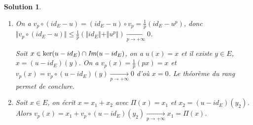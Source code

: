 \documentclass[12pt]{article}
\newtheorem{solution}{Solution}[section]
\theoremstyle{remark}
\numberwithin{equation}{section}
\begin{document}
\begin{solution}
	\phantom{}
	\begin{enumerate}
		\item On a $v_{p}\circ(id_{E}-u)=(id_{E}-u)\circ v_{p}=\frac{1}{p}(id_{E}-u^{p})$, donc $\Vert v_{p}\circ(id_{E}-u)\Vert\leqslant\frac{1}{p}(\Vert id_{E}\Vert+\Vert u^{p}\Vert)\xrightarrow[p\to+\infty]{}0$.
		
		Soit $x\in\ker(u-id_{E})\cap\emph{Im}(u-id_{E})$, on a $u(x)=x$ et il existe $y\in E$, $x=(u-id_{E})(y)$. On a $v_{p}(x)=\frac{1}{p}(px)=x$ et $v_{p}(x)=v_{p}\circ(u-id_{E})(y)\xrightarrow[p\to+\infty]{}0$ d'où $x=0$. Le théorème du rang permet de conclure.

		\item Soit $x\in E$, on écrit $x=x_{1}+x_{2}$ avec $\Pi(x)=x_{1}$ et $x_{2}=(u-id_{E})(y_{2})$. Alors $v_{p}(x)=x_{1}+v_{p}\circ(u-id_{E})(y_{2})\xrightarrow[p\to+\infty]{}x_{1}=\Pi(x)$.
	\end{enumerate}
\end{solution}
\end{document}

